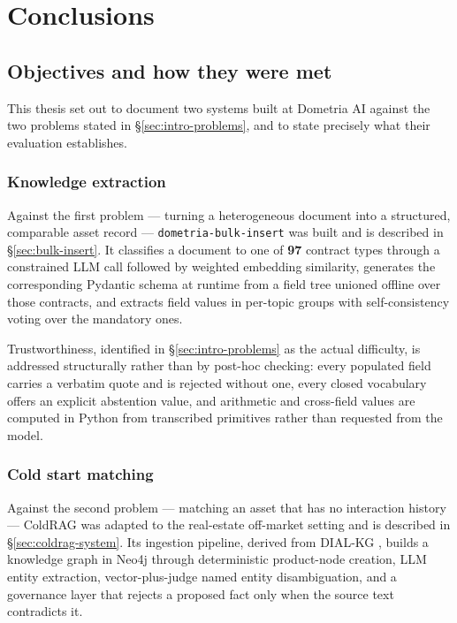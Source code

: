 \chapter{Conclusions}
\label{ch:conclusions}

\section{Objectives and how they were met}
\label{sec:conclusions-summary}

This thesis set out to document two systems built at Dometria AI against the two problems stated in \S\ref{sec:intro-problems}, and to state precisely what their evaluation establishes.

\subsection{Knowledge extraction}

Against the first problem — turning a heterogeneous document into a structured, comparable asset record — \texttt{dometria-bulk-insert} was built and is described in \S\ref{sec:bulk-insert}. It classifies a document to one of \textbf{97} contract types through a constrained LLM call followed by weighted embedding similarity, generates the corresponding Pydantic schema at runtime from a field tree unioned offline over those contracts, and extracts field values in per-topic groups with self-consistency voting over the mandatory ones. 

Trustworthiness, identified in \S\ref{sec:intro-problems} as the actual difficulty, is addressed structurally rather than by post-hoc checking: every populated field carries a verbatim quote and is rejected without one, every closed vocabulary offers an explicit abstention value, and arithmetic and cross-field values are computed in Python from transcribed primitives rather than requested from the model.

\subsection{Cold start matching}

Against the second problem — matching an asset that has no interaction history — ColdRAG was adapted to the real-estate off-market setting and is described in \S\ref{sec:coldrag-system}. Its ingestion pipeline, derived from DIAL-KG \citep{bao2026dial}, builds a knowledge graph in Neo4j through deterministic product-node creation, LLM entity extraction, vector-plus-judge named entity disambiguation, and a governance layer that rejects a proposed fact only when the source text contradicts it. 


